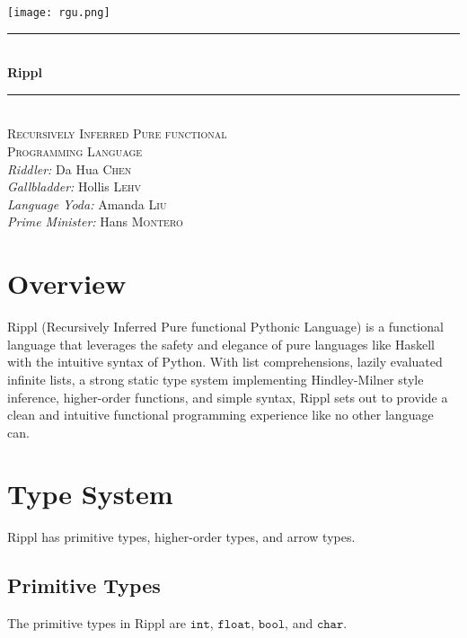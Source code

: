 \documentclass[5pt]{article}
\begin{document}
\begin{titlepage}
\newcommand{\HRule}{\rule{\linewidth}{0.5mm}} %
\begin{center} 
 
\texttt{[image: rgu.png]}\\[1cm] 

\HRule \\[0.4cm]
{ \Huge \bfseries Rippl}\\[0.2cm]
\HRule \\[0.8cm]

 \textsc{\LARGE  Recursively Inferred Pure functional \\ Programming Language}\\[1.5cm]

\large \emph{Riddler:}
Da Hua \textsc{Chen}\\
\large \emph{Gallbladder:}
Hollis \textsc{Lehv}\\
\large \emph{Language Yoda:}
Amanda \textsc{Liu}\\ 
\large \emph{Prime Minister:}
Hans \textsc{Montero}\\
\vfill %
\end{center} 

\end{titlepage}


\pagebreak
\tableofcontents
\pagebreak
\section{Overview}
Rippl (Recursively Inferred Pure functional Pythonic Language) is a functional language that leverages the safety and elegance of pure languages like Haskell with the intuitive syntax of Python. With list comprehensions, lazily evaluated infinite lists, a strong static type system implementing Hindley-Milner style inference, higher-order functions, and simple syntax, Rippl sets out to provide a clean and intuitive functional programming experience like no other language can.

\section{Type System}
Rippl has primitive types, higher-order types, and arrow types.

\subsection{Primitive Types}
The primitive types in Rippl are $\texttt{int}$, $\texttt{float}$, $\texttt{bool}$, and $\texttt{char}$.
\end{document}
